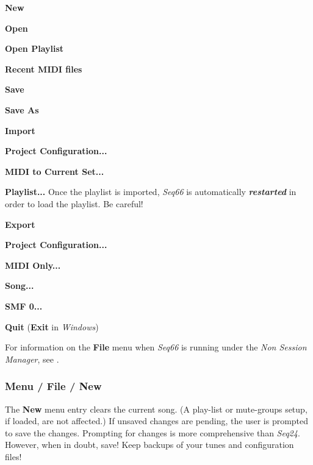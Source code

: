    \begin{enumber}
      \item \textbf{New}
      \item \textbf{Open}
      \item \textbf{Open Playlist}
      \item \textbf{Recent MIDI files}
      \item \textbf{Save}
      \item \textbf{Save As}
      \item \textbf{Import}
      \begin{enumber}
         \item \textbf{Project Configuration...}
         \item \textbf{MIDI to Current Set...}
         \item \textbf{Playlist...}
         Once the playlist is imported,
         \textsl{Seq66} is automatically \textsl{\textbf{restarted}}
         in order to load the playlist.
         Be careful!
      \end{enumber}
      \item \textbf{Export}
      \begin{enumber}
         \item \textbf{Project Configuration...}
         \item \textbf{MIDI Only...}
         \item \textbf{Song...}
         \item \textbf{SMF 0...}
      \end{enumber}
      \item \textbf{Quit} (\textbf{Exit} in \textsl{Windows})
   \end{enumber}

   For information on the \textbf{File} menu when \textsl{Seq66} is
   running under the \textsl{Non Session Manager}, see
   .

\subsubsection{Menu / File / New}
\label{subsec:menu_file_new}

   The \textbf{New} menu entry clears the current song.
   (A play-list or mute-groups setup, if loaded, are not affected.)
   If unsaved changes are pending, the user is prompted to save the changes.
   Prompting for changes is more comprehensive than \textsl{Seq24}.
   However, when in doubt, save!
   Keep backups of your tunes and configuration files!

